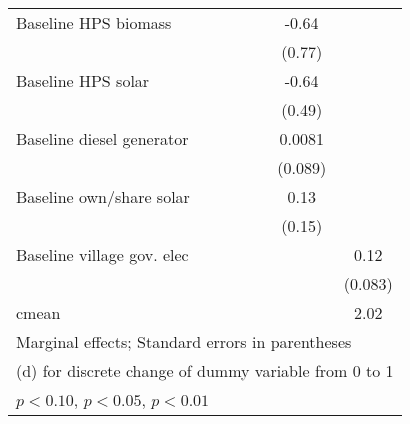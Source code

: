 \begin{table}[htbp]
\begin{tabular*}{1\hsize}{@{\hskip\tabcolsep\extracolsep\fill}l*{6}{c}}
Baseline HPS biomass&                  &                  &                  &                  &    -0.64         &                  \\
                &                  &                  &                  &                  &   (0.77)         &                  \\
Baseline HPS solar&                  &                  &                  &                  &    -0.64         &                  \\
                &                  &                  &                  &                  &   (0.49)         &                  \\
Baseline diesel generator&                  &                  &                  &                  &   0.0081         &                  \\
                &                  &                  &                  &                  &  (0.089)         &                  \\
Baseline own/share solar&                  &                  &                  &                  &     0.13         &                  \\
                &                  &                  &                  &                  &   (0.15)         &                  \\
Baseline village gov. elec&                  &                  &                  &                  &                  &     0.12         \\
                &                  &                  &                  &                  &                  &  (0.083)         \\
\midrule
cmean           &                  &                  &                  &                  &                  &     2.02         \\
\bottomrule
\multicolumn{7}{l}{\footnotesize Marginal effects; Standard errors in parentheses}\\
\multicolumn{7}{l}{\footnotesize  (d) for discrete change of dummy variable from 0 to 1}\\
\multicolumn{7}{l}{\footnotesize \sym{*} \(p<0.10\), \sym{**} \(p<0.05\), \sym{***} \(p<0.01\)}\\
\end{tabular*}
\end{table}
